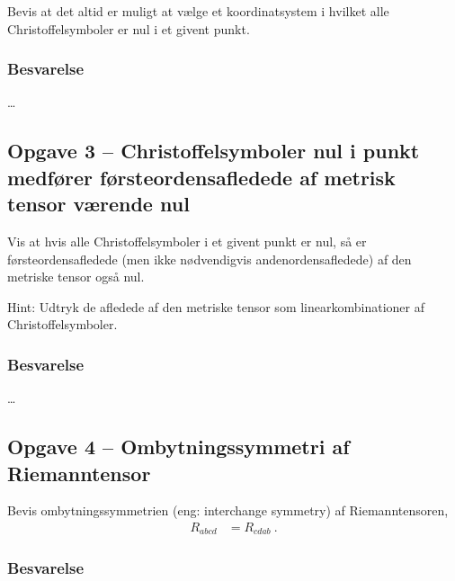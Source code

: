 \documentclass[../main.tex]{subfiles}
\begin{document}
Bevis at det altid er muligt at vælge et koordinatsystem i hvilket alle Christoffelsymboler er nul i et givent punkt.


\subsubsection{Besvarelse}

\ldots




\subsection{Opgave 3 -- Christoffelsymboler nul i punkt medfører førsteordensafledede af metrisk tensor værende nul}
\setcounter{subsection}{3}
\setcounter{equation}{0}

Vis at hvis alle Christoffelsymboler i et givent punkt er nul, så er førsteordensafledede (men ikke nødvendigvis andenordensafledede) af den metriske tensor også nul.

Hint: Udtryk de afledede af den metriske tensor som linearkombinationer af Christoffelsymboler.


\subsubsection{Besvarelse}

\ldots




\subsection{Opgave 4 -- Ombytningssymmetri af Riemanntensor}
\setcounter{subsection}{4}
\setcounter{equation}{0}

Bevis ombytningssymmetrien (eng: interchange symmetry) af Riemanntensoren,
\begin{align}
    R_{abcd} &= R_{cdab} \: .
\end{align}


\subsubsection*{Besvarelse}
\end{document}
